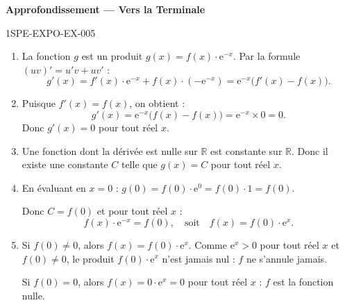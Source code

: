 \begin{center}\textbf{Approfondissement — Vers la Terminale}\end{center}
\begin{corrige}{1SPE-EXPO-EX-005}
\begin{enumerate}
\item La fonction $g$ est un produit $g(x) = f(x) \cdot \mathrm{e}^{-x}$. Par la formule $(uv)' = u'v + uv'$ :
\[g'(x) = f'(x) \cdot \mathrm{e}^{-x} + f(x) \cdot (-\mathrm{e}^{-x}) = \mathrm{e}^{-x}\bigl(f'(x) - f(x)\bigr).\]

\item Puisque $f'(x) = f(x)$, on obtient :
\[g'(x) = \mathrm{e}^{-x}\bigl(f(x) - f(x)\bigr) = \mathrm{e}^{-x} \times 0 = 0.\]
Donc $g'(x) = 0$ pour tout réel $x$.

\item Une fonction dont la dérivée est nulle sur $\mathbb{R}$ est constante sur $\mathbb{R}$. Donc il existe une constante $C$ telle que $g(x) = C$ pour tout réel $x$.

\item En évaluant en $x = 0$ : $g(0) = f(0) \cdot \mathrm{e}^{0} = f(0) \cdot 1 = f(0)$.

Donc $C = f(0)$ et pour tout réel $x$ :
\[f(x) \cdot \mathrm{e}^{-x} = f(0), \quad \text{soit} \quad f(x) = f(0) \cdot \mathrm{e}^x.\]

\item Si $f(0)
\neq 0$, alors $f(x) = f(0) \cdot \mathrm{e}^x$. Comme $\mathrm{e}^x > 0$ pour tout réel $x$ et $f(0)
\neq 0$, le produit $f(0) \cdot \mathrm{e}^x$ n'est jamais nul : $f$ ne s'annule jamais.

Si $f(0) = 0$, alors $f(x) = 0 \cdot \mathrm{e}^x = 0$ pour tout réel $x$ : $f$ est la fonction nulle.
\end{enumerate}
\end{corrige}
